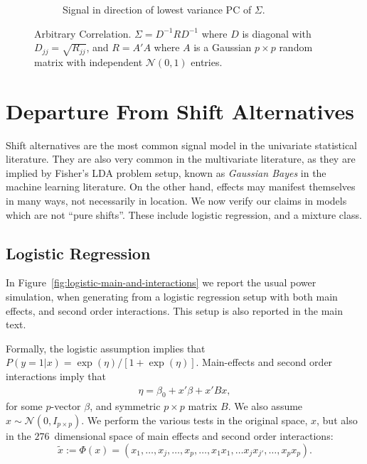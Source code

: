 \documentclass[oupdraft]{bio}
\begin{document}
\begin{figure}[h]
\begin{subfigure}[t]{.45\columnwidth}
		\caption{Signal in direction of lowest variance PC of $\Sigma$.} 
		\label{fig:dependence_32}
	\end{subfigure}
	\caption{Arbitrary Correlation. 
		$\Sigma=D^{-1} R D^{-1}$ where $D$ is diagonal with $D_{jj}=\sqrt{R_{jj}}$, and $R=A'A$ where $A$ is a Gaussian $p\times p$ random matrix with independent $\mathcal{N}(0,1)$ entries.
	}
	\label{fig:dependence_3}
\end{figure}






\section{Departure From Shift Alternatives}

Shift alternatives are the most common signal model in the univariate statistical literature. 
They are also very common in the multivariate literature, as they are implied by Fisher's LDA problem setup, known as \emph{Gaussian Bayes} in the machine learning literature.
On the other hand, effects may manifest themselves in many ways, not necessarily in location. 
We now verify our claims in models which are not ``pure shifts''. 
These include logistic regression, and a mixture class. 


\subsection{Logistic Regression}

In Figure~\ref{fig:logistic-main-and-interactions} we report the usual power simulation, when generating from a logistic regression setup with both main effects, and second order interactions.
This setup is also reported in the main text.

Formally, the logistic assumption implies that 
$P(y=1|x)=\exp(\eta)/[1+\exp(\eta)]$.
Main-effects and second order interactions imply that 
\begin{align}
	\eta=\beta_0+x'\beta +x'Bx,
\end{align}
for some $p$-vector $\beta$, and symmetric $p \times p$ matrix $B$.
We also assume $x \sim \mathcal{N}(0,I_{p\times p})$.
We perform the various tests in the original space, $x$, but also in the $276$~dimensional space of main effects and second order interactions: 
$$\tilde{x}:=\Phi(x)=(x_1,\dots,x_j,\dots,x_p,\dots,x_1x_1,\dots x_jx_{j'},\dots,x_p x_p).$$
\end{document}
